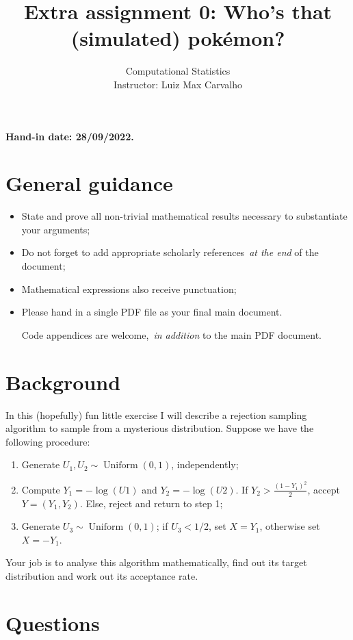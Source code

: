 \documentclass[a4paper,10pt, notitlepage]{report}
\title{Extra assignment 0: Who's that (simulated) pokémon?}
\author{Computational Statistics \\ Instructor: Luiz Max  Carvalho}
\begin{document}
\maketitle

\textbf{Hand-in date: 28/09/2022.}

\section*{General guidance}
\begin{itemize}
 \item State and prove all non-trivial mathematical results necessary to substantiate your arguments;
 \item Do not forget to add appropriate scholarly references~\textit{at the end} of the document;
 \item Mathematical expressions also receive punctuation;
 \item Please hand in a single PDF file as your final main document.
 
 Code appendices are welcome,~\textit{in addition} to the main PDF document.
 \end{itemize}

\section*{Background}

In this (hopefully) fun little exercise I will describe a rejection sampling algorithm to sample from a mysterious distribution.
Suppose we have the following procedure:
\begin{enumerate}
    \item Generate $U_1, U_2 \sim \operatorname{Uniform}(0, 1)$, independently;
    \item Compute $Y_1 = -\log(U1)$ and $Y_2 = -\log(U2)$.
    If $Y_2 > \frac{(1-Y_1)^2}{2}$, accept $Y = (Y_1, Y_2)$.
    Else, reject and return to step 1;
    \item Generate $U_3 \sim \operatorname{Uniform}(0, 1)$; if $U_3 < 1/2$, set $X = Y_1$, otherwise set $X = -Y_1$.
\end{enumerate}

Your job is to analyse this algorithm mathematically, find out its target distribution and work out its acceptance rate. 

\newpage

\section*{Questions}
\end{document}
